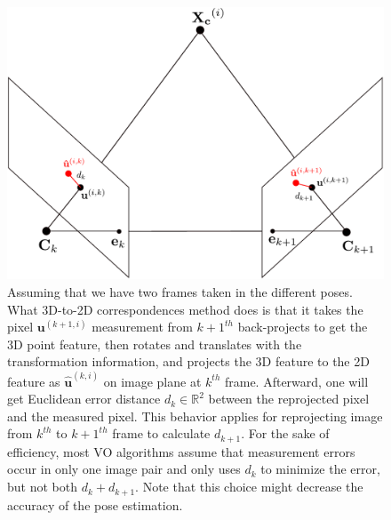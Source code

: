 \documentclass[a4paper]{report}
\numberwithin{figure}{section}
\newcommand{\R}{\mathbb{R}}
\begin{document}
\begin{figure}[H]
	\centering
  \includegraphics[width=0.9\linewidth,natwidth=640,natheight=640]
  {fig/drawings/3d_to_2d.pdf}
  \caption[3D-to-2D Correspondences]{Assuming that we have two frames taken in 
  the different poses. What 3D-to-2D correspondences method does is that it 
  takes the pixel $\mathbf{u}^{(k+1,i)}$ measurement from $k+1^{th}$ 
  back-projects to get the 3D point feature, then rotates and translates with 
  the transformation information, and projects the 3D feature to the 2D 
  feature as $\mathbf{\hat{u}}^{(k,i)}$ on image plane at $k^{th}$ frame. 
  Afterward, one will get Euclidean error distance $d_k \in \R^2$ between the 
  reprojected pixel and the measured pixel. This behavior applies for 
  reprojecting image from $k^{th}$ to $k+1^{th}$ frame to calculate $d_{k+1}$. 
  For the sake of efficiency, most VO algorithms assume that measurement 
  errors occur in only one image pair and only uses $d_k$ to minimize the 
  error, but not both $d_k+d_{k+1}$. Note that 
  this choice might decrease the accuracy of the 
  pose estimation.}
	\label{fig:min_geometric_error}
\end{figure}
\end{document}
